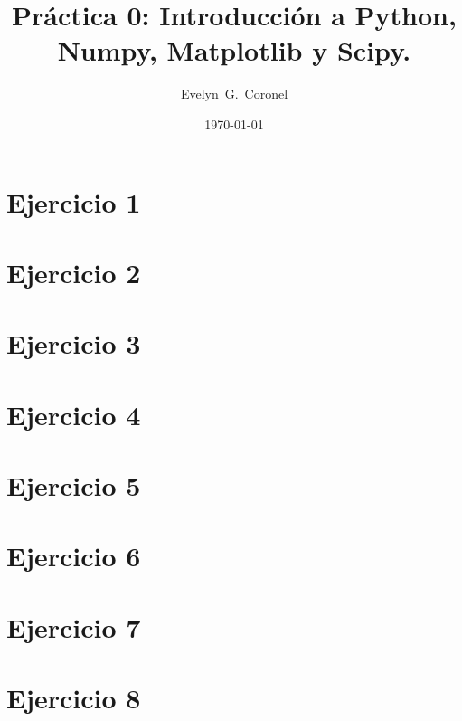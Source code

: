 



\title{Práctica 0: Introducción a Python, Numpy, Matplotlib y Scipy.}
\author{Evelyn~G.~Coronel}


\date[]{\lowercase{\today}} %


\maketitle


\section*{Ejercicio 1}


\section*{Ejercicio 2}


\section*{Ejercicio 3}


\section*{Ejercicio 4}


\section*{Ejercicio 5}


\section*{Ejercicio 6}


\section*{Ejercicio 7}


\section*{Ejercicio 8}


